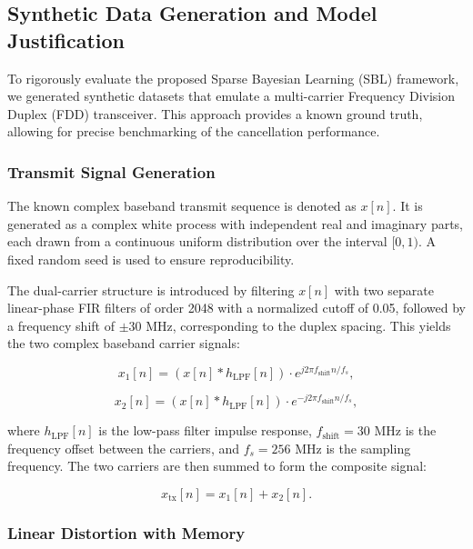 \subsection{Synthetic Data Generation and Model Justification}

To rigorously evaluate the proposed Sparse Bayesian Learning (SBL) framework, we generated synthetic datasets that emulate a multi-carrier Frequency Division Duplex (FDD) transceiver. This approach provides a known ground truth, allowing for precise benchmarking of the cancellation performance.

\subsubsection{Transmit Signal Generation}

The known complex baseband transmit sequence is denoted as \( x[n] \). It is generated as a complex white process with independent real and imaginary parts, each drawn from a continuous uniform distribution over the interval \([0, 1)\). A fixed random seed is used to ensure reproducibility.

The dual-carrier structure is introduced by filtering \( x[n] \) with two separate linear-phase FIR filters of order 2048 with a normalized cutoff of 0.05, followed by a frequency shift of \( \pm 30 \) MHz, corresponding to the duplex spacing. This yields the two complex baseband carrier signals:

\begin{equation}
x_1[n] = \left( x[n] * h_{\mathrm{LPF}}[n] \right) \cdot e^{j 2\pi f_{\mathrm{shift}} n / f_s},
\end{equation}

\begin{equation}
x_2[n] = \left( x[n] * h_{\mathrm{LPF}}[n] \right) \cdot e^{-j 2\pi f_{\mathrm{shift}} n / f_s},
\end{equation}

where \( h_{\mathrm{LPF}}[n] \) is the low-pass filter impulse response, \( f_{\mathrm{shift}} = 30 \) MHz is the frequency offset between the carriers, and \( f_s = 256 \) MHz is the sampling frequency. The two carriers are then summed to form the composite signal:

\begin{equation}
x_{\mathrm{tx}}[n] = x_1[n] + x_2[n].
\end{equation}

\subsubsection{Linear Distortion with Memory}

